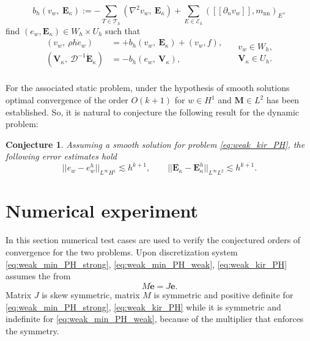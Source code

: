 \documentclass{ifacconf}
\newtheorem{conjecture}{Conjecture}
\begin{document}
\[
b_h(v_w, \ \bm{E}_{\kappa}) := - \sum_{T \in \mathcal{T}_h} ( \nabla^2 v_w, \ \bm{E}_\kappa) + \sum_{E \in \mathcal{E}_h} ([\![\partial_n v_w]\!], m_{\text{nn}})_{E}, 
\]
find $(e_w, \bm{E}_\kappa) \in W_h \times U_h$ such that
\begin{equation}
\label{eq:weak_kir_PH}
\begin{aligned}
(v_w, \ \rho h \dot{e}_w) &= +b_h(v_w, \ \bm{E}_{\kappa}) + (v_w, f), \\ 
(\bm{V}_\kappa, \ \mathcal{D}^{-1} \dot{\bm{E}}_\kappa) &= -b_h(e_w, \ \bm{V}_{\kappa}), \\ 
\end{aligned} \quad
\begin{aligned}
v_w \in W_h, \\
\bm{V}_\kappa \in U_h. \\
\end{aligned}
\end{equation}

For the associated static problem, under the hypothesis of smooth solutions optimal convergence of the order $O(k+1)$ for $w \in H^1$ and $\bm{M} \in L^2$ has been established. So, it is natural to conjecture the following result for the dynamic problem:
\begin{conjecture}
Assuming a smooth solution for problem \eqref{eq:weak_kir_PH}, the following error estimates hold
\begin{equation}
||e_w - e_w^h||_{L^{\infty} H^1} \lesssim h^{k+1}, \qquad
||\bm{E}_\kappa - \bm{E}_\kappa^h||_{L^{\infty} L^2} \lesssim h^{k+1}.
\end{equation}
\end{conjecture}


\section{Numerical experiment}
In this section numerical test cases are used to verify the conjectured orders of convergence for the two problems. Upon discretization system \eqref{eq:weak_min_PH_strong}, \eqref{eq:weak_min_PH_weak}, \eqref{eq:weak_kir_PH} assumes the from 
\[
M \dot{\bm{e}} = J \bm{e}.
\]
Matrix $J$ is skew symmetric, matrix $M$ is symmetric and positive definite for \eqref{eq:weak_min_PH_strong}, \eqref{eq:weak_kir_PH} while it is symmetric and indefinite for \eqref{eq:weak_min_PH_weak}, because of the multiplier that enforces the symmetry.
\end{document}
